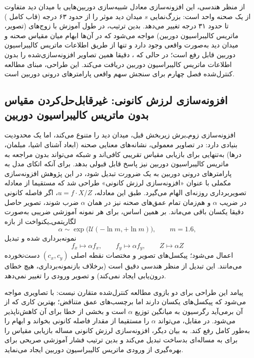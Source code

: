 از منظر هندسی، این افزونه‌سازی معادل شبیه‌سازی دوربین‌هایی با میدان دید متفاوت از یک صحنه واحد است: بزرگ‌نمایی $s$ میدان دید موثر را از حدود ۶۳ درجه (قاب کامل ) تا حدود ۳۱ درجه تغییر می‌دهد. بدین ترتیب، \proposedmodel{} در طول آموزش با زوج‌های (تصویر، ماتریس کالیبراسیون دوربین) مواجه می‌شود که در آن‌ها ابهام میان مقیاس صحنه و میدان دید به‌صورت واقعی وجود دارد و تنها از طریق اطلاعات ماتریس کالیبراسیون دوربین قابل رفع است؛ در حالی که \controlmodel{}، دقیقا همین تصاویر افزونه‌سازی‌شده را بدون اطلاعات ماتریس کالیبراسیون دوربین دریافت می‌کند. این طراحی، مبنای مطالعه کنترل‌شده فصل چهارم برای سنجش سهم واقعی پارامترهای درونی دوربین است.

\subsection{افزونه‌سازی لرزش کانونی: غیرقابل‌حل‌کردن مقیاس بدون ماتریس کالیبراسیون دوربین}
\label{subsec:focal_jitter}

افزونه‌سازی زوم‌ـ‌برش زیربخش قبل، میدان دید را متنوع می‌کند، اما یک محدودیت بنیادی دارد: در تصاویر معمولی، نشانه‌های معنایی صحنه (ابعاد آشنای اشیا، مبلمان، درها) به‌تنهایی برای بازیابی مقیاس تقریبی کافی‌اند و شبکه می‌تواند بدون مراجعه به ماتریس کالیبراسیون دوربین نیز پاسخ قابل قبولی بدهد. برای آنکه اتکای مدل به پارامترهای درونی دوربین به یک ضرورت تبدیل شود، در این پژوهش افزونه‌سازی مکملی با عنوان «افزونه‌سازی لرزش کانونی» طراحی شد که مستقیما از معادله تصویربرداری روزنه‌ای الهام می‌گیرد. طبق این معادله، $u = f \cdot X / Z$، اگر فاصله کانونی در ضریب $\alpha$ و هم‌زمان تمام عمق‌های صحنه نیز در همان $\alpha$ ضرب شوند، تصویر حاصل دقیقا یکسان باقی می‌ماند. بر همین اساس، برای هر نمونه آموزشی ضریبی به‌صورت لگاریتمی‌ـ‌یکنواخت از بازه
\begin{equation}
\alpha \sim \exp\bigl(\mathcal{U}(-\ln m, +\ln m)\bigr), \qquad m = 1.6,
\end{equation}
نمونه‌برداری شده و تبدیل
\begin{equation}
f_x \mapsto \alpha f_x, \qquad f_y \mapsto \alpha f_y, \qquad Z \mapsto \alpha Z
\end{equation}
اعمال می‌شود؛ پیکسل‌های تصویر و مختصات نقطه اصلی $(c_x, c_y)$ دست‌نخورده می‌مانند. این تبدیل از منظر هندسی دقیق است (برخلاف بازنمونه‌برداری، هیچ خطای درون‌یابی ایجاد نمی‌کند) و تصویر ورودی را تغییر نمی‌دهد.

پیامد این طراحی برای دو بازوی مطالعه کنترل‌شده متقارن نیست: \controlmodel{} با تصاویری مواجه می‌شود که پیکسل‌های یکسان دارند اما برچسب‌های عمق متناقض؛ بهترین کاری که از آن برمی‌آید رگرسیون به میانگین توزیع $\alpha$ است و بخشی از خطا برای آن کاهش‌ناپذیر می‌شود. در مقابل، \proposedmodel{} می‌تواند $\alpha$ را مستقیما از مقدار فاصله کانونی بخواند و ابهام را به‌طور کامل رفع کند. به بیان دیگر، افزونه‌سازی لرزش کانونی مساله بازیابی مقیاس را برای \controlmodel{} به مساله‌ای بدساخت تبدیل می‌کند و بدین ترتیب فشار آموزشی صریحی برای بهره‌گیری از ورودی ماتریس کالیبراسیون دوربین ایجاد می‌نماید.

